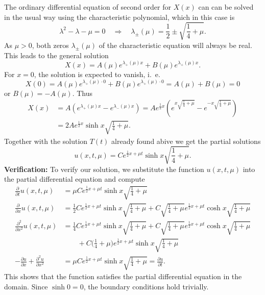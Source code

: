\begin{loesung}
\begin{teilaufgaben}
The ordinary differential equation of second order for $X(x)$ can
can be solved in the usual way using the characteristic polynomial,
which in this case is
\[
\lambda^2-\lambda-\mu=0
\quad
\Rightarrow
\quad
\lambda_{\pm}(\mu)=\frac12\pm\sqrt{\frac14+\mu}.
\]
As $\mu>0$, both zeros $\lambda_{\pm}(\mu)$ of the characteristic
equation will always be real.
This leads to the general solution
\[
X(x)=
A(\mu)e^{\lambda_+(\mu)x}
+
B(\mu)e^{\lambda_+(\mu)x}.
\]
For $x=0$, the solution is expected to vanish, i.~e.
\[
X(0)=
A(\mu)e^{\lambda_+(\mu)\cdot 0}
+
B(\mu)e^{\lambda_+(\mu)\cdot 0}
=A(\mu)+B(\mu)=0
\]
or $B(\mu)=-A(\mu)$.
Thus
\begin{align*}
X(x)&=A(e^{\lambda_+(\mu)x}-e^{\lambda_-(\mu)x})
=Ae^{\frac12x}\left(
e^{x\sqrt{\frac14+\mu}}
-
e^{-x\sqrt{\frac14+\mu}}
\right)
\\
&=2Ae^{\frac12x}\sinh x\sqrt{\frac14+\mu}.
\end{align*}
Together with the solution $T(t)$ already found abive we get the
partial solutions
\[
u(x,t,\mu)=
Ce^{\frac12x+\mu t}\sinh x\sqrt{\frac14+\mu}.
\]
{\bf Verification:}
To verify our solution, we substitute the function $u(x,t,\mu)$
into the partial differential equation and compute
\begin{align*}
\frac{\partial}{\partial t}u(x,t,\mu)&=
\mu Ce^{\frac12x+\mu t}\sinh x\sqrt{\frac14+\mu}
\\
\frac{\partial}{\partial x}u(x,t,\mu)&=
\frac12
Ce^{\frac12x+\mu t}\sinh x\sqrt{\frac14+\mu}
+
C\sqrt{\frac14+\mu}e^{\frac12x+\mu t}\cosh x\sqrt{\frac14+\mu}
\\
\frac{\partial^2}{\partial x^2}u(x,t,\mu)&=
\frac14
Ce^{\frac12x+\mu t}\sinh x\sqrt{\frac14+\mu}
+
C\sqrt{\frac14+\mu}e^{\frac12x+\mu t}\cosh x\sqrt{\frac14+\mu}
\\
&\qquad +
C\biggl(\frac14+\mu\biggr)e^{\frac12x+\mu t}\sinh x\sqrt{\frac14+\mu}
\\
-\frac{\partial u}{\partial x}
+
\frac{\partial^2 u}{\partial x^2}
&=
\mu Ce^{\frac12x+\mu t}\sinh x\sqrt{\frac14+\mu}
=
\frac{\partial u}{\partial t}.
\end{align*}
This shows that the function satisfies the partial differential
equation in the domain.
Since $\sinh 0=0$, the boundary conditions hold trivially.
\qedhere
\end{teilaufgaben}
\end{loesung}
